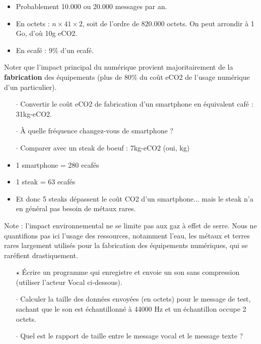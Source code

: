 \begin{reponse}
\begin{itemize}
\item Probablement 10.000 ou 20.000 messages par an.
\item En octets : $n \times 41 \times 2$, soit de l'ordre de $820.000$ octets. On peut arrondir à 1 Go, d'où 10g eCO2.
\item En ecafé : 9\% d'un ecafé.
\end{itemize}
\end{reponse}


Noter que l'impact principal du numérique provient majoritairement de la \textbf{fabrication} des équipements (plus de 80\% du coût eCO2 de l'usage numérique d'un particulier).

\begin{itemize}[itemsep=0.2ex]
\item[$\cdot$] Convertir le coût eCO2 de fabrication d'un smartphone en équivalent café : 31kg-eCO2.
\item[$\cdot$] À quelle fréquence changez-vous de smartphone ?
\item[$\cdot$] Comparer avec un steak de boeuf : 7kg-eCO2 (oui, kg) {\footnotesize \color{gray}{(à quelle fréquence mangez-vous de la viande ?)}}
\end{itemize}

\begin{reponse}
\begin{itemize}
\item 1 smartphone = 280 ecafés
\item 1 steak = 63 ecafés
\item Et donc 5 steaks dépassent le coût CO2 d'un smartphone... mais le steak n'a en général pas besoin de métaux rares.
\end{itemize}
\end{reponse}

\medskip

Note : l'impact environnemental ne se limite pas aux gaz à effet de serre. Nous ne quantifions pas ici l'usage des ressources, notamment l'eau, les métaux et terres rares largement utilisés pour la fabrication des équipements numériques, qui se raréfient drastiquement.


\begin{itemize}
\item[$\star$] Écrire un programme qui enregistre et envoie un son sans compression (utiliser l'acteur Vocal ci-dessous).
\item[$\cdot$] Calculer la taille des données envoyées (en octets) pour le message de test, sachant que le son est échantillonné à 44000 Hz et un échantillon occupe 2 octets.
\item[$\cdot$] Quel est le rapport de taille entre le message vocal et le message texte ?
\end{itemize}

